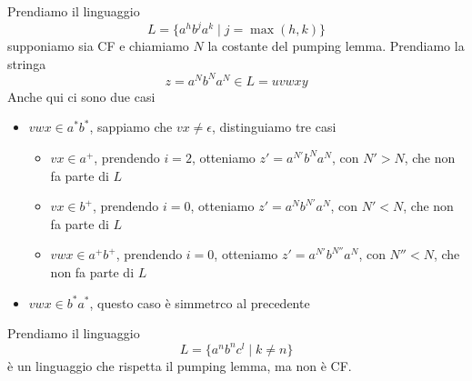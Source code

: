 \documentclass[12pt]{report}
\begin{document}
\begin{tcolorbox}[breakable]
	Prendiamo il linguaggio
	$$ L = \{ a^h b^j a^k \mid j = \max(h, k) \} $$
	supponiamo sia CF e chiamiamo $N$ la costante del pumping lemma.
	Prendiamo la stringa
	$$ z = a^N b^N a^N  \in L = u v w x y $$
	Anche qui ci sono due casi
	\begin{itemize}
		\item $vwx \in a^* b^*$, sappiamo che $vx \neq \epsilon$, distinguiamo tre casi
			\begin{itemize}
				\item $vx \in a^+$, prendendo $i = 2$, otteniamo $z' = a^{N'} b^N a^N$, con $N' > N$, che non fa parte di $L$
				\item $vx \in b^+$, prendendo $i = 0$, otteniamo $z' = a^N b^{N'} a^N$, con $N' < N$, che non fa parte di $L$
				\item $vwx \in a^+b^+$, prendendo $i = 0$, otteniamo $z' = a^{N'} b^{N''} a^N$, con $N'' < N$, che non fa parte di $L$
			\end{itemize}
		\item $vwx \in b^* a^*$, questo caso è simmetrco al precedente
	\end{itemize}
\end{tcolorbox}

\begin{tcolorbox}
	Prendiamo il linguaggio
	$$ L = \{ a^n b^n c^l \mid k \neq n \} $$
	è un linguaggio che rispetta il pumping lemma, ma non è CF.
\end{tcolorbox}


 
\end{document}

